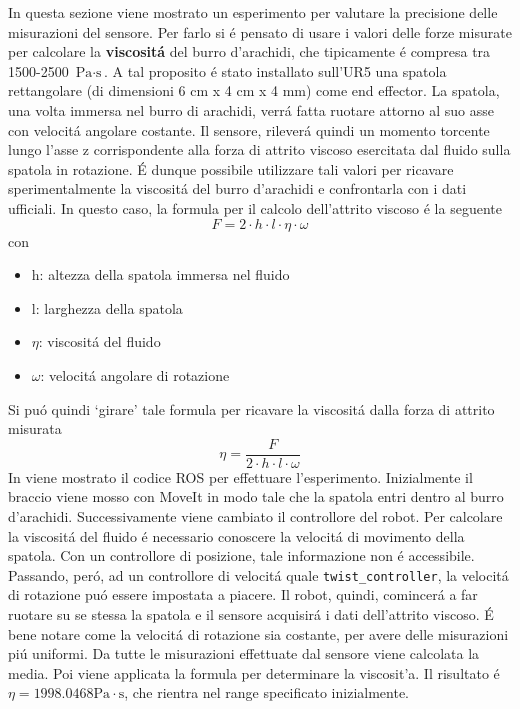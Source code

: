 In questa sezione viene mostrato un esperimento per valutare la precisione delle misurazioni del sensore. 
Per farlo si \'{e} pensato di usare i valori delle forze misurate per calcolare la \textbf{viscosit\'{a}} del burro d'arachidi, 
che tipicamente \'{e} compresa tra 1500-2500 $\text{Pa} \cdot \text{s}$. 
A tal proposito \'{e} stato installato sull'UR5 una spatola rettangolare (di dimensioni 6 cm x 4 cm x 4 mm) come end effector. 
La spatola, una volta immersa nel burro di arachidi, verr\'{a} fatta ruotare attorno al suo asse con velocit\'{a} angolare 
costante. Il sensore, rilever\'{a} quindi un momento torcente lungo l'asse z corrispondente alla forza di attrito viscoso esercitata 
dal fluido sulla spatola in rotazione. \'{E} dunque possibile utilizzare tali valori per ricavare sperimentalmente 
la viscosit\'{a} del burro d'arachidi e confrontarla con i dati ufficiali. 
In questo caso, la formula per il calcolo dell'attrito viscoso \'{e} la seguente 
\begin{equation*}
    F = 2 \cdot h \cdot l \cdot \eta \cdot \omega
\end{equation*}
con 
\begin{itemize}
    \item h: altezza della spatola immersa nel fluido
    \item l: larghezza della spatola
    \item $\eta$: viscosit\'{a} del fluido
    \item $\omega$: velocit\'{a} angolare di rotazione
\end{itemize}
Si pu\'{o} quindi `girare' tale formula per ricavare la viscosit\'{a} dalla forza di attrito misurata 
\begin{equation*}
    \eta = \frac{F}{2 \cdot h \cdot l \cdot \omega}
\end{equation*}
In \cite{viscosity} viene mostrato il codice ROS per effettuare l'esperimento.
Inizialmente il braccio viene mosso con MoveIt in modo tale che la spatola entri dentro al burro d'arachidi. 
Successivamente viene cambiato il controllore del robot. Per calcolare la viscosit\'{a} del fluido \'{e} necessario conoscere 
la velocit\'{a} di movimento della spatola. Con un controllore di posizione, tale informazione non \'{e} accessibile. Passando, 
per\'{o}, ad un controllore di velocit\'{a} quale \verb|twist_controller|, la velocit\'{a} di rotazione pu\'{o} essere impostata 
a piacere. Il robot, quindi, comincer\'{a} a far ruotare su se stessa la spatola e il sensore acquisir\'{a} i dati dell'attrito 
viscoso. \'{E} bene notare come la velocit\'{a} di rotazione sia costante, per avere delle misurazioni pi\'{u} uniformi.
Da tutte le misurazioni effettuate dal sensore viene calcolata la media. Poi viene applicata la formula per determinare la 
viscosit'{a}. Il risultato \'{e} $\eta = 1998.0468 \text{Pa} \cdot \text{s}$, che rientra nel range specificato inizialmente.